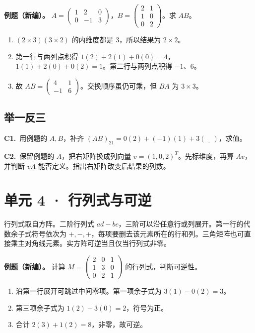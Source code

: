\documentclass[UTF8,a4paper,11pt]{ctexart}
\newcommand{\PracticeQuestion}[3]{\par\Needspace{4\baselineskip}\noindent\begin{minipage}{\linewidth}\textbf{#1.}\ #2\par\noindent\rule{0pt}{#3mm}\par\end{minipage}\par}
\begin{document}
\textbf{例题（新编）。} $A=\begin{pmatrix}1&2&0\\0&-1&3\end{pmatrix}$，$B=\begin{pmatrix}2&1\\1&0\\0&2\end{pmatrix}$。求 $AB$。

\begin{enumerate}
\item $(2\times3)(3\times2)$ 的内维度都是 3，所以结果为 $2\times2$。
\item 第一行与两列点积得 $1(2)+2(1)+0(0)=4$，$1(1)+2(0)+0(2)=1$。第二行与两列点积得 $-1$、$6$。
\item 故 $AB=\begin{pmatrix}4&1\\-1&6\end{pmatrix}$。交换顺序虽仍可乘，但 $BA$ 为 $3\times3$。
\end{enumerate}
\subsection{举一反三}
\PracticeQuestion{C1}{用例题的 $A,B$，补齐 $(AB)_{21}=0(2)+(-1)(1)+3(\underline{\quad})$，求值。}{27}
\PracticeQuestion{C2}{保留例题的 $A$，把右矩阵换成列向量 $v=(1,0,2)^T$。先标维度，再算 $Av$，并判断 $vA$ 能否定义。指出右矩阵改变后结果的列数。}{35}
\clearpage
\section{单元 4 · 行列式与可逆}
行列式取自方阵。二阶行列式 $ad-bc$，三阶可以沿任意行或列展开。第一行的代数余子式符号依次为 $+,-,+$，每项要删去该元素所在的行和列。三角矩阵也可直接乘主对角线元素。实方阵可逆当且仅当行列式非零。

\textbf{例题（新编）。} 计算 $M=\begin{pmatrix}2&0&1\\1&3&0\\0&2&1\end{pmatrix}$ 的行列式，判断可逆性。

\begin{enumerate}
\item 沿第一行展开可跳过中间零项。第一项余子式为 $3(1)-0(2)=3$。
\item 第三项余子式为 $1(2)-3(0)=2$，符号为正。
\item 合计 $2(3)+1(2)=8$，非零，故可逆。
\end{enumerate}
\end{document}
